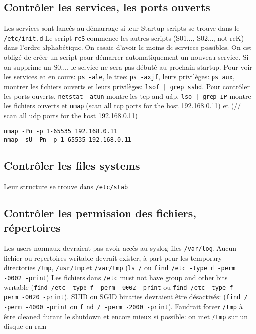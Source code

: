 \subsection{Contrôler les services, les ports ouverts}
Les services sont lancés au démarrage si leur Startup scripts se trouve dans le \verb!/etc/init.d!
Le script \verb!rcS! commence les autres scripts (S01..., S02..., not rcK) dans l'ordre alphabétique. On essaie d'avoir le moins de services possibles. On est obligé de créer un script pour démarrer automatiquement un nouveau service. Si on supprime un S0.... le service ne sera pas débuté au prochain startup. Pour voir les services en en cours: \verb!ps -ale!, le tree: \verb!ps -axjf!, leurs privilèges: \verb!ps aux!, montrer les fichiers ouverts et leurs privilèges: \verb!lsof | grep sshd!. Pour contrôler les ports ouverts, \verb!netstat -atun! montre les tcp and udp, \verb!lso | grep IP! montre les fichiers ouverts et \verb!nmap! (scan all tcp ports for the host 192.168.0.11) et (// scan all udp ports for the host 192.168.0.11)
\begin{lstlisting}[style=bash]
nmap -Pn -p 1-65535 192.168.0.11 
nmap -sU -Pn -p 1-65535 192.168.0.11 
\end{lstlisting}

\subsection{Contrôler les files systems}
Leur structure se trouve dans \verb!/etc/stab!

\subsection{Contrôler les permission des fichiers, répertoires}
Les users normaux devraient pas avoir accès au syslog files \verb!/var/log!. Aucun fichier ou repertoires writable devrait exister, à part pour les temporary directories \verb!/tmp!, \verb!/usr/tmp! et \verb!/var/tmp! (\verb!ls /! ou \verb!find /etc -type d -perm -0002 -print!) 
Les fichiers dans \verb!/etc! must not have group and other bits writable (\verb!find /etc -type f -perm -0002 -print! ou \verb!find /etc -type f -perm -0020 -print!). SUID ou SGID binaries devraient être désactivés: (\verb!find / -perm -4000 -print! ou \verb!find / -perm -2000 -print!). Faudrait forcer \verb!/tmp! à être cleaned durant le shutdown et encore mieux si possible: on met \verb!/tmp! sur un disque en ram

